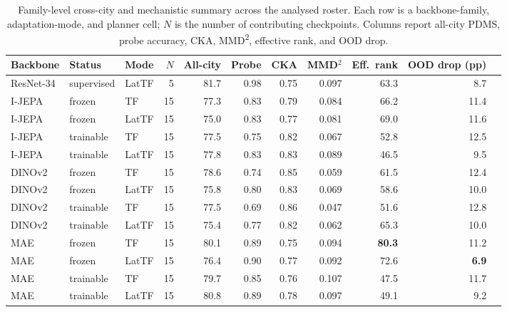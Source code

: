 \begin{table}[ht]
\centering
\footnotesize
\begin{adjustbox}{max width=\textwidth}
\begin{tabular}{lllrrrrrrrr}
\toprule
Backbone & Status & Mode & $N$ & All-city & Probe & CKA & MMD$^2$ & Eff.\ rank & OOD drop (pp) \\
\midrule
ResNet-34 & supervised & LatTF & 5  & 81.7 & 0.98 & 0.75 & 0.097 & 63.3 & 8.7 \\
I-JEPA    & frozen     & TF    & 15 & 77.3 & 0.83 & 0.79 & 0.084 & 66.2 & 11.4 \\
I-JEPA    & frozen     & LatTF & 15 & 75.0 & 0.83 & 0.77 & 0.081 & 69.0 & 11.6 \\
I-JEPA    & trainable  & TF    & 15 & 77.5 & 0.75 & 0.82 & 0.067 & 52.8 & 12.5 \\
I-JEPA    & trainable  & LatTF & 15 & 77.8 & 0.83 & 0.83 & 0.089 & 46.5 & 9.5 \\
DINOv2    & frozen     & TF    & 15 & 78.6 & 0.74 & 0.85 & 0.059 & 61.5 & 12.4 \\
DINOv2    & frozen     & LatTF & 15 & 75.8 & 0.80 & 0.83 & 0.069 & 58.6 & 10.0 \\
DINOv2    & trainable  & TF    & 15 & 77.5 & 0.69 & 0.86 & 0.047 & 51.6 & 12.8 \\
DINOv2    & trainable  & LatTF & 15 & 75.4 & 0.77 & 0.82 & 0.062 & 65.3 & 10.0 \\
MAE       & frozen     & TF    & 15 & 80.1 & 0.89 & 0.75 & 0.094 & \textbf{80.3} & 11.2 \\
MAE       & frozen     & LatTF & 15 & 76.4 & 0.90 & 0.77 & 0.092 & 72.6 & \textbf{6.9} \\
MAE       & trainable  & TF    & 15 & 79.7 & 0.85 & 0.76 & 0.107 & 47.5 & 11.7 \\
MAE       & trainable  & LatTF & 15 & 80.8 & 0.89 & 0.78 & 0.097 & 49.1 & 9.2 \\
\bottomrule
\end{tabular}
\end{adjustbox}
\caption[Comprehensive cross-city and mechanistic summary across the roster.]{Family-level cross-city and mechanistic summary across the analysed roster. Each row is a backbone-family, adaptation-mode, and planner cell; $N$ is the number of contributing checkpoints. Columns report all-city PDMS, probe accuracy, CKA, MMD\textsuperscript{2}, effective rank, and OOD drop.}
\label{tab:family-aggregate}
\end{table}

